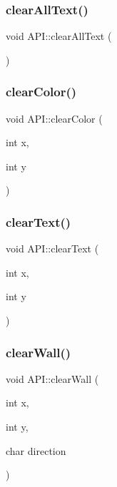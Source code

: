 \subsubsection{\texorpdfstring{clear\+All\+Text()}{clearAllText()}}
{\footnotesize\ttfamily void A\+P\+I\+::clear\+All\+Text (\begin{DoxyParamCaption}{ }\end{DoxyParamCaption})\hspace{0.3cm}{\ttfamily [static]}}

\mbox{\label{class_a_p_i_ae5c04edd8e44f455ac6bf8a19c2ba282}} 
\subsubsection{\texorpdfstring{clear\+Color()}{clearColor()}}
{\footnotesize\ttfamily void A\+P\+I\+::clear\+Color (\begin{DoxyParamCaption}\item[{int}]{x,  }\item[{int}]{y }\end{DoxyParamCaption})\hspace{0.3cm}{\ttfamily [static]}}

\mbox{\label{class_a_p_i_a0937e059fff7d9543187765500fa4968}} 
\subsubsection{\texorpdfstring{clear\+Text()}{clearText()}}
{\footnotesize\ttfamily void A\+P\+I\+::clear\+Text (\begin{DoxyParamCaption}\item[{int}]{x,  }\item[{int}]{y }\end{DoxyParamCaption})\hspace{0.3cm}{\ttfamily [static]}}

\mbox{\label{class_a_p_i_a3178d408a832d81500847ca62ce1f509}} 
\subsubsection{\texorpdfstring{clear\+Wall()}{clearWall()}}
{\footnotesize\ttfamily void A\+P\+I\+::clear\+Wall (\begin{DoxyParamCaption}\item[{int}]{x,  }\item[{int}]{y,  }\item[{char}]{direction }\end{DoxyParamCaption})\hspace{0.3cm}{\ttfamily [static]}}

